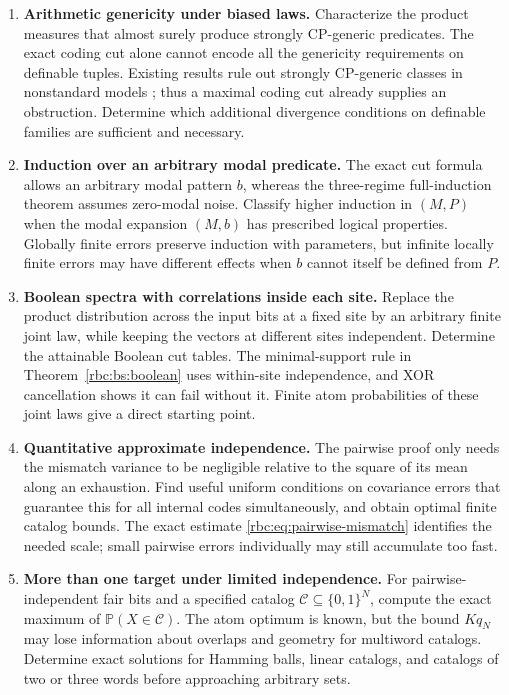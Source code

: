 \documentclass[11pt]{article}
\numberwithin{equation}{section}
\theoremstyle{definition}
\theoremstyle{remark}
\newcommand{\Prob}{\mathbb P}
\begin{document}
\begin{enumerate}[label=\textbf{Q\arabic*.},ref=Q\arabic*,leftmargin=*]
\item \textbf{Arithmetic genericity under biased laws.}\label{rbc:q:cpgeneric}
Characterize the product measures that almost surely produce strongly
CP-generic predicates. The exact coding cut alone cannot encode all the
genericity requirements on definable tuples. Existing results rule out
strongly CP-generic classes in nonstandard models
\cite{abdul-quader-schmerl}; thus a maximal coding cut already supplies
an obstruction. Determine which additional divergence conditions on
definable families are sufficient and necessary.

\item \textbf{Induction over an arbitrary modal predicate.}\label{rbc:q:modal}
The exact cut formula allows an arbitrary modal pattern $b$, whereas
the three-regime full-induction theorem assumes zero-modal noise.
Classify higher induction in $(M,P)$ when the modal expansion $(M,b)$
has prescribed logical properties. Globally finite errors preserve
induction with parameters, but infinite locally finite errors may have
different effects when $b$ cannot itself be defined from $P$.

\item \textbf{Boolean spectra with correlations inside each site.}\label{rbc:q:withinsite}
Replace the product distribution across the input bits at a fixed site
by an arbitrary finite joint law, while keeping the vectors at different
sites independent. Determine the attainable Boolean cut tables. The
minimal-support rule in Theorem~\ref{rbc:bs:boolean} uses within-site
independence, and XOR cancellation shows it can fail without it. Finite
atom probabilities of these joint laws give a direct starting point.

\item \textbf{Quantitative approximate independence.}\label{rbc:q:approx}
The pairwise proof only needs the mismatch variance to be negligible
relative to the square of its mean along an exhaustion. Find useful
uniform conditions on covariance errors that guarantee this for all
internal codes simultaneously, and obtain optimal finite catalog bounds.
The exact estimate \eqref{rbc:eq:pairwise-mismatch} identifies the needed
scale; small pairwise errors individually may still accumulate too fast.

\item \textbf{More than one target under limited independence.}\label{rbc:q:multiword}
For pairwise-independent fair bits and a specified catalog
$\mathcal C\subseteq\{0,1\}^N$, compute the exact maximum of
$\Prob(X\in\mathcal C)$. The atom optimum is known, but the bound
$Kq_N$ may lose information about overlaps and geometry for multiword
catalogs. Determine exact solutions for Hamming balls, linear catalogs,
and catalogs of two or three words before approaching arbitrary sets.


\end{enumerate}
\end{document}
